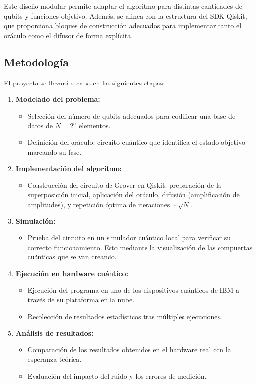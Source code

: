 \documentclass{article}
\begin{document}
Este diseño modular permite adaptar el algoritmo para distintas cantidades de qubits y funciones objetivo. Además, se alinea con la estructura del SDK Qiskit, que proporciona bloques de construcción adecuados para implementar tanto el oráculo como el difusor de forma explícita.

\subsection{Metodología}

El proyecto se llevará a cabo en las siguientes etapas:

\begin{enumerate}
    \item \textbf{Modelado del problema:}
    \begin{itemize}
        \item Selección del número de qubits adecuados para codificar una base de datos de $N = 2^n$ elementos.
        \item Definición del oráculo: circuito cuántico que identifica el estado objetivo marcando su fase.
    \end{itemize}
    
    \item \textbf{Implementación del algoritmo:}
    \begin{itemize}
        \item Construcción del circuito de Grover en Qiskit: preparación de la superposición inicial, aplicación del oráculo, difusión (amplificación de amplitudes), y repetición óptima de iteraciones $\sim \sqrt{N}$.
    \end{itemize}
    
    \item \textbf{Simulación:}
    \begin{itemize}
        \item Prueba del circuito en un simulador cuántico local para verificar su 
                correcto funcionamiento. Esto mediante la 
                visualización de las compuertas cuánticas que se van creando.
    \end{itemize}
    
    \item \textbf{Ejecución en hardware cuántico:}
    \begin{itemize}
        \item Ejecución del programa en uno de los dispositivos cuánticos de IBM a través de su plataforma en la nube.
        \item Recolección de resultados estadísticos tras múltiples ejecuciones.
    \end{itemize}
    
    \item \textbf{Análisis de resultados:}
    \begin{itemize}
        \item Comparación de los resultados obtenidos en el hardware real con
            la esperanza teórica.
        \item Evaluación del impacto del ruido y los errores de medición.
    \end{itemize}
\end{enumerate}
\end{document}
